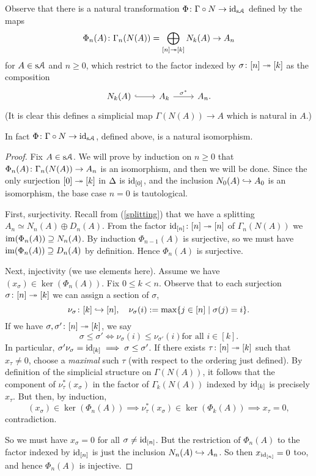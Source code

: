 \begin{definition}
  Observe that there is
  a natural transformation $\Phi \colon \Gamma \circ N \to \mathrm{id}_{\mathrm{s}\mathcal{A}}$
  defined by the maps
  \[
  \Phi_n(A) \colon \Gamma_n(N(A)) = \bigoplus_{[n] \twoheadrightarrow [k]} N_k(A) \to A_n
  \]
  for $A \in \mathrm{s}\mathcal{A}$ and $n \ge 0$, which restrict to the factor indexed
  by $\sigma \colon [n] \twoheadrightarrow [k]$ as the composition
  \[
  \begin{tikzcd}
    N_k(A) \ar[hookrightarrow]{r} & A_k \rar{\sigma^*} & A_n.
  \end{tikzcd}
  \]
  (It is clear this defines a simplicial map $\Gamma(N(A)) \to A$ which
  is natural in $A$.)
\end{definition}

\begin{lemma}
  \label{gamma-n}
  In fact $\Phi \colon \Gamma \circ N \to \mathrm{id}_{\mathrm{s}\mathcal{A}}$, defined above, is a
  natural isomorphism.
\end{lemma}

\begin{proof}
  Fix $A \in \mathrm{s}\mathcal{A}$. We will prove by induction on $n \ge 0$ that
  $\Phi_n(A) \colon \Gamma_n(N(A)) \to A_n$ is an isomorphism, and then we
  will be done. Since the only surjection $[0] \twoheadrightarrow [k]$ in
  $\Delta$ is $\mathrm{id}_{[0]}$, and the inclusion $N_0(A) \hookrightarrow A_0$ is an
  isomorphism, the base case $n=0$ is tautological.

  First, surjectivity. Recall from (\ref{splitting}) that we have a
  splitting $A_n \simeq N_n(A) \oplus D_n(A)$. From the factor
  $\mathrm{id}_{[n]} \colon [n] \twoheadrightarrow [n]$ of $\Gamma_n(N(A))$ we $\operatorname{im}(\Phi_n(A))
  \supseteq N_n(A)$. By induction $\Phi_{n-1}(A)$ is surjective, so we
  must have $\operatorname{im}(\Phi_n(A)) \supseteq D_n(A)$ by definition. Hence
  $\Phi_n(A)$ is surjective.

  Next, injectivity (we use elements here). Assume we have $(x_\sigma)
  \in \ker(\Phi_n(A))$.  Fix $0 \le k < n$. Observe that to each
  surjection $\sigma \colon [n] \twoheadrightarrow [k]$ we can assign a section of
  $\sigma$,
  \[
  \nu_\sigma \colon [k] \hookrightarrow [n], \quad \nu_\sigma(i) \mathrel{:=} \max\{j \in
     [n] \mid \sigma(j) = i\}.
  \]
  If we have $\sigma, \sigma' \colon [n] \twoheadrightarrow [k]$, we say
  \[
  \sigma \le \sigma' \iff \nu_\sigma(i) \le \nu_{\sigma'}(i) \text{
    for all } i \in [k].
  \]
  In particular, $\sigma'\nu_\sigma = \mathrm{id}_{[k]} \implies \sigma \le
  \sigma'$. If there exists $\tau \colon [n] \twoheadrightarrow [k]$ such that $x_\tau
  \ne 0$, choose a \textit{maximal} such $\tau$ (with respect to the
  ordering just defined). By definition of the simplicial structure on
  $\Gamma(N(A))$, it follows that the component of
  $\nu_\tau^*(x_\sigma)$ in the factor of $\Gamma_k(N(A))$ indexed by
  $\mathrm{id}_{[k]}$ is precisely $x_\tau$. But then, by induction,
  \[
  (x_\sigma) \in \ker(\Phi_n(A)) \implies \nu_\tau^*(x_\sigma) \in
  \ker(\Phi_k(A)) \implies x_\tau = 0,
  \]
  contradiction.

  So we must have $x_\sigma = 0$ for all $\sigma \ne \mathrm{id}_{[n]}$. But
  the restriction of $\Phi_n(A)$ to the factor indexed by $\mathrm{id}_{[n]}$
  is just the inclusion $N_n(A) \hookrightarrow A_n$. So then $x_{\mathrm{id}_{[n]}} = 0$
  too, and hence $\Phi_n(A)$ is injective.
\end{proof}

